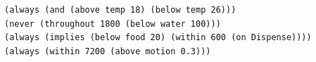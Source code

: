 \begin{lstlisting}[language={},basicstyle=\ttfamily\footnotesize,breaklines=true]
(always (and (above temp 18) (below temp 26)))
(never (throughout 1800 (below water 100)))
(always (implies (below food 20) (within 600 (on Dispense))))
(always (within 7200 (above motion 0.3)))
\end{lstlisting}
